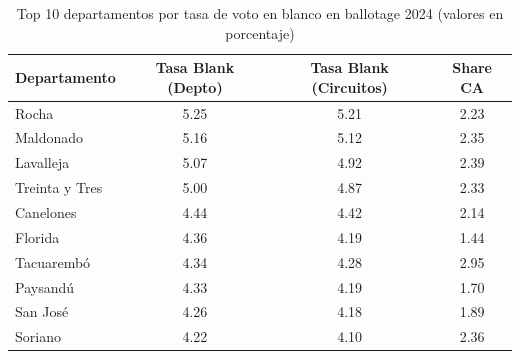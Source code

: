 \begin{table}
\caption{Top 10 departamentos por tasa de voto en blanco en ballotage 2024 (valores en porcentaje)}
\label{tab:blank_by_dept}
\begin{tabular}{lccc}
\toprule
Departamento & Tasa Blank (Depto) & Tasa Blank (Circuitos) & Share CA \\
\midrule
Rocha & 5.25 & 5.21 & 2.23 \\
Maldonado & 5.16 & 5.12 & 2.35 \\
Lavalleja & 5.07 & 4.92 & 2.39 \\
Treinta y Tres & 5.00 & 4.87 & 2.33 \\
Canelones & 4.44 & 4.42 & 2.14 \\
Florida & 4.36 & 4.19 & 1.44 \\
Tacuarembó & 4.34 & 4.28 & 2.95 \\
Paysandú & 4.33 & 4.19 & 1.70 \\
San José & 4.26 & 4.18 & 1.89 \\
Soriano & 4.22 & 4.10 & 2.36 \\
\bottomrule
\end{tabular}
\end{table}

